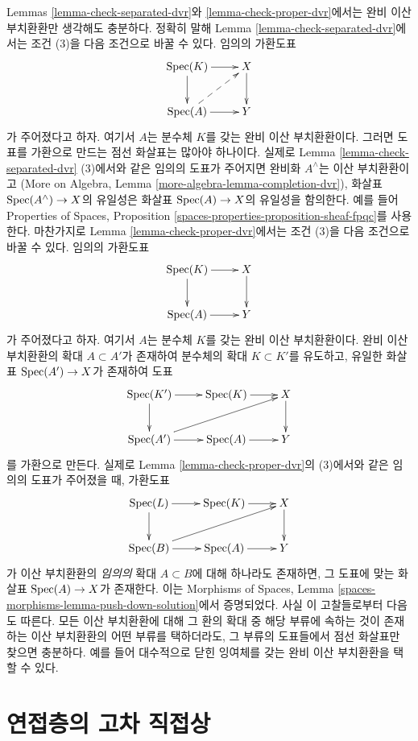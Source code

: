 \begin{remark}[완비 이산 부치환환에 대한 변형]
\label{remark-variant}
Lemmas \ref{lemma-check-separated-dvr}와
\ref{lemma-check-proper-dvr}에서는 완비 이산 부치환환만 생각해도
충분하다. 정확히 말해 Lemma \ref{lemma-check-separated-dvr}에서는
조건 (3)을 다음 조건으로 바꿀 수 있다. 임의의 가환도표
$$
\xymatrix{
\Spec(K) \ar[r] \ar[d] & X \ar[d] \\
\Spec(A) \ar[r] \ar@{-->}[ru] & Y
}
$$
가 주어졌다고 하자. 여기서 $A$는 분수체 $K$를 갖는 완비 이산
부치환환이다. 그러면 도표를 가환으로 만드는 점선 화살표는 많아야
하나이다. 실제로 Lemma \ref{lemma-check-separated-dvr} (3)에서와 같은
임의의 도표가 주어지면 완비화 $A^\wedge$는 이산 부치환환이고
(More on Algebra, Lemma
\ref{more-algebra-lemma-completion-dvr}), 화살표
$\mathop{\mathrm{Spec}}(A^\wedge) \to X$의 유일성은 화살표 $\mathop{\mathrm{Spec}}(A) \to X$의
유일성을 함의한다. 예를 들어 Properties of Spaces, Proposition
\ref{spaces-properties-proposition-sheaf-fpqc}를 사용한다.
마찬가지로 Lemma \ref{lemma-check-proper-dvr}에서는 조건 (3)을 다음
조건으로 바꿀 수 있다. 임의의 가환도표
$$
\xymatrix{
\Spec(K) \ar[r] \ar[d] & X \ar[d] \\
\Spec(A) \ar[r] & Y
}
$$
가 주어졌다고 하자. 여기서 $A$는 분수체 $K$를 갖는 완비 이산
부치환환이다. 완비 이산 부치환환의 확대 $A \subset A'$가 존재하여
분수체의 확대 $K \subset K'$를 유도하고, 유일한 화살표
$\mathop{\mathrm{Spec}}(A') \to X$가 존재하여 도표
$$
\xymatrix{
\Spec(K') \ar[r] \ar[d] & \Spec(K) \ar[r] & X \ar[d] \\
\Spec(A') \ar[r] \ar[rru] & \Spec(A) \ar[r] & Y
}
$$
를 가환으로 만든다.
실제로 Lemma \ref{lemma-check-proper-dvr}의 (3)에서와 같은 임의의
도표가 주어졌을 때, 가환도표
$$
\xymatrix{
\Spec(L) \ar[r] \ar[d] & \Spec(K) \ar[r] & X \ar[d] \\
\Spec(B) \ar[r] \ar[rru] & \Spec(A) \ar[r] & Y
}
$$
가 이산 부치환환의 {\it 임의의} 확대 $A \subset B$에 대해 하나라도
존재하면, 그 도표에 맞는 화살표 $\mathop{\mathrm{Spec}}(A) \to X$가 존재한다.
이는 Morphisms of Spaces, Lemma
\ref{spaces-morphisms-lemma-push-down-solution}에서 증명되었다.
사실 이 고찰들로부터 다음도 따른다. 모든 이산 부치환환에 대해 그
환의 확대 중 해당 부류에 속하는 것이 존재하는 이산 부치환환의
어떤 부류를 택하더라도, 그 부류의 도표들에서 점선 화살표만 찾으면
충분하다. 예를 들어 대수적으로 닫힌 잉여체를 갖는 완비 이산
부치환환을 택할 수 있다.
\end{remark}







\section{연접층의 고차 직접상}
\label{section-proper-pushforward}

